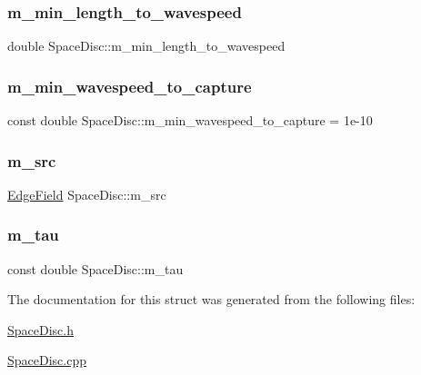 \subsubsection{\texorpdfstring{m\+\_\+min\+\_\+length\+\_\+to\+\_\+wavespeed}{m\_min\_length\_to\_wavespeed}}
{\footnotesize\ttfamily double Space\+Disc\+::m\+\_\+min\+\_\+length\+\_\+to\+\_\+wavespeed\hspace{0.3cm}{\ttfamily [protected]}}

\mbox{\label{structSpaceDisc_a1951aa057a9226abb36b3c183cf5434b}} 
\subsubsection{\texorpdfstring{m\+\_\+min\+\_\+wavespeed\+\_\+to\+\_\+capture}{m\_min\_wavespeed\_to\_capture}}
{\footnotesize\ttfamily const double Space\+Disc\+::m\+\_\+min\+\_\+wavespeed\+\_\+to\+\_\+capture = 1e-\/10\hspace{0.3cm}{\ttfamily [protected]}}

\mbox{\label{structSpaceDisc_a31d451e05cdd7c4378279bf87c08c4fa}} 
\subsubsection{\texorpdfstring{m\+\_\+src}{m\_src}}
{\footnotesize\ttfamily \hyperlink{ValueField_8h_afe95c3cf57931e46528822035916f101}{Edge\+Field} Space\+Disc\+::m\+\_\+src\hspace{0.3cm}{\ttfamily [protected]}}

\mbox{\label{structSpaceDisc_a3caf9e3638808eaf891f1ecf7299504a}} 
\subsubsection{\texorpdfstring{m\+\_\+tau}{m\_tau}}
{\footnotesize\ttfamily const double Space\+Disc\+::m\+\_\+tau\hspace{0.3cm}{\ttfamily [protected]}}



The documentation for this struct was generated from the following files\+:\begin{DoxyCompactItemize}
\item 
\hyperlink{SpaceDisc_8h}{Space\+Disc.\+h}\item 
\hyperlink{SpaceDisc_8cpp}{Space\+Disc.\+cpp}\end{DoxyCompactItemize}
